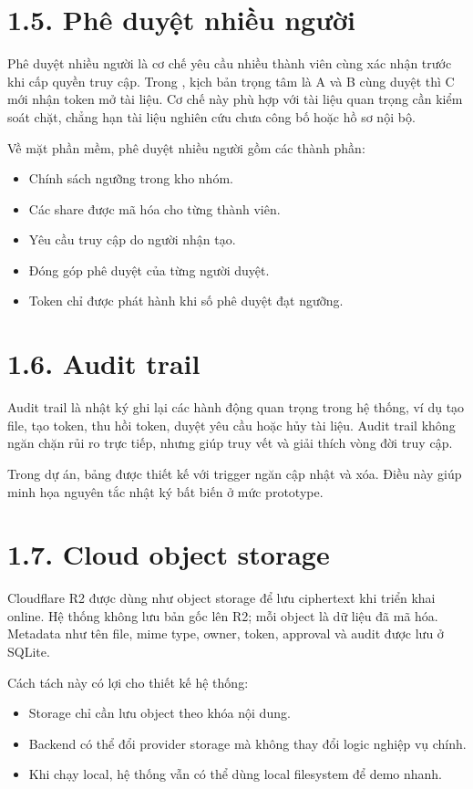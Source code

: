 \section*{1.5. Phê duyệt nhiều người}
{}

Phê duyệt nhiều người là cơ chế yêu cầu nhiều thành viên cùng xác nhận trước khi cấp quyền truy cập. Trong \projectname{}, kịch bản trọng tâm là A và B cùng duyệt thì C mới nhận token mở tài liệu. Cơ chế này phù hợp với tài liệu quan trọng cần kiểm soát chặt, chẳng hạn tài liệu nghiên cứu chưa công bố hoặc hồ sơ nội bộ.

Về mặt phần mềm, phê duyệt nhiều người gồm các thành phần:

\begin{itemize}
  \item Chính sách ngưỡng trong kho nhóm.
  \item Các share được mã hóa cho từng thành viên.
  \item Yêu cầu truy cập do người nhận tạo.
  \item Đóng góp phê duyệt của từng người duyệt.
  \item Token chỉ được phát hành khi số phê duyệt đạt ngưỡng.
\end{itemize}

\section*{1.6. Audit trail}
{}

Audit trail là nhật ký ghi lại các hành động quan trọng trong hệ thống, ví dụ tạo file, tạo token, thu hồi token, duyệt yêu cầu hoặc hủy tài liệu. Audit trail không ngăn chặn rủi ro trực tiếp, nhưng giúp truy vết và giải thích vòng đời truy cập.

Trong dự án, bảng  được thiết kế với trigger ngăn cập nhật và xóa. Điều này giúp minh họa nguyên tắc nhật ký bất biến ở mức prototype.

\section*{1.7. Cloud object storage}
{}

Cloudflare R2 được dùng như object storage để lưu ciphertext khi triển khai online. Hệ thống không lưu bản gốc lên R2; mỗi object là dữ liệu đã mã hóa. Metadata như tên file, mime type, owner, token, approval và audit được lưu ở SQLite.

Cách tách này có lợi cho thiết kế hệ thống:

\begin{itemize}
  \item Storage chỉ cần lưu object theo khóa nội dung.
  \item Backend có thể đổi provider storage mà không thay đổi logic nghiệp vụ chính.
  \item Khi chạy local, hệ thống vẫn có thể dùng local filesystem để demo nhanh.
\end{itemize}

\clearpage
